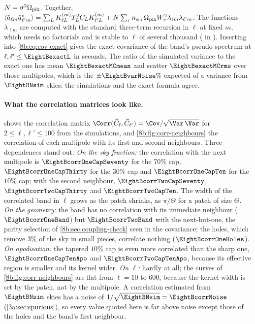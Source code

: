 $N=\sigma^2\Omega_{\rm pix}$. Together,
$\langle\tilde a_{\ell m}\tilde a^*_{\ell'm}\rangle=\sum_LK^{(m)}_{\ell L}T_L^2C_LK^{(m)}_{\ell'L}+N\sum_rn_{\phi,r}\Omega_{\rm pix}W_r^2\lambda_{\ell m}\lambda_{\ell'm}$.
The functions $\lambda_{\ell m}$ are computed with the standard
three-term recursion in $\ell$ at fixed $m$, which needs no factorials and is stable to $\ell$ of several
thousand ( in ). Inserting into \eqref{8b:eq:cov-exact} gives the
exact covariance of the band's pseudo-spectrum at $\ell,\ell'\le\EightBexactL$ in seconds. The ratio of the
simulated variance to the exact one has mean $\EightBexactMCmean$ and scatter $\EightBexactMCrms$ over those
multipoles, which is the $\pm\EightBvarNoise\%$ expected of a variance from $\EightBNsim$ skies: the simulations
and the exact formula agree.

\paragraph{What the correlation matrices look like.}
 shows the correlation matrix
$\Corr(\widetilde C_\ell,\widetilde C_{\ell'})=\Cov/\sqrt{\Var\,\Var}$ for $2\le\ell,\ell'\le100$ from the simulations, and
\cref{8b:fig:corr-neighbours} the correlation of each multipole with its first and second neighbours.
Three dependences stand out. \emph{On the sky fraction:} the correlation with the next multipole is
$\EightBcorrOneCapSeventy$ for the $70\%$ cap, $\EightBcorrOneCapThirty$ for the $30\%$ cap and $\EightBcorrOneCapTen$ for the $10\%$
cap; with the second neighbour, $\EightBcorrTwoCapSeventy$, $\EightBcorrTwoCapThirty$ and $\EightBcorrTwoCapTen$. The width of the
correlated band in $\ell$ grows as the patch shrinks, as $\pi/\Theta$ for a patch of size $\Theta$. \emph{On the
geometry:} the band has no correlation with its immediate neighbour ($\EightBcorrOneBand$) but
$\EightBcorrTwoBand$ with the next-but-one, the parity selection of \cref{8b:sec:coupling-check} seen in the
covariance; the holes, which remove $3\%$ of the sky in small pieces, correlate nothing
($\EightBcorrOneHoles$). \emph{On apodisation:} the tapered $10\%$ cap is even more correlated than the sharp
one, $\EightBcorrOneCapTenApo$ and $\EightBcorrTwoCapTenApo$, because its effective region is smaller and its kernel
wider. \emph{On $\ell$:} hardly at all; the curves of \cref{8b:fig:corr-neighbours} are flat from $\ell=10$ to
$600$, because the kernel width is set by the patch, not by the multipole. A correlation estimated
from $\EightBNsim$ skies has a noise of $1/\sqrt{\EightBNsim}=\EightBcorrNoise$ (\cref{3a:sec:spurious}), so every value
quoted here is far above noise except those of the holes and the band's first neighbour.

